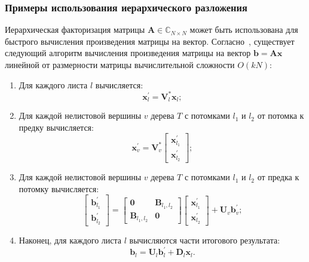 \subsubsection{Примеры использования иерархического разложения}
Иерархическая факторизация матрицы $\mathbf{A} \in \mathbb{C}_{N \times N}$ может быть использована для быстрого вычисления произведения матрицы на вектор. Согласно~\cite{probHSS}, существует следующий алгоритм вычисления произведения матрицы на вектор $\mathbf{b} = \mathbf{A}\mathbf{x}$ линейной от размерности матрицы вычислительной сложности $O(kN)$:
\begin{enumerate}
	\item Для каждого листа $l$ вычисляется:
	\[
		\mathbf{x}^{\prime}_{l} = \mathbf{V}^{*}_{l} \mathbf{x}_{l};
	\]
	\item Для каждой нелистовой вершины $v$ дерева $T$ с потомками $l_1$ и $l_2$ от потомка к предку вычисляется:
	\[
		\mathbf{x}^{\prime}_{v} = \mathbf{V}^{*}_{v}
		\begin{bmatrix}
			\mathbf{x}^{\prime}_{l_1} \\
			\mathbf{x}^{\prime}_{l_2}
		\end{bmatrix};
	\]
	\item Для каждой нелистовой вершины $v$ дерева $T$ с потомками $l_1$ и $l_2$ от предка к потомку вычисляется:
	\[
		\begin{bmatrix}
			\mathbf{b}^{\prime}_{l_1} \\
			\mathbf{b}^{\prime}_{l_2}
		\end{bmatrix}
		=
		\begin{bmatrix}
			\mathbf{0} & \mathbf{B}_{l_1,l_2} \\
			\mathbf{B}_{l_1,l_2} & \mathbf{0}
		\end{bmatrix}
		\begin{bmatrix}
			\mathbf{x}^{\prime}_{l_1} \\
			\mathbf{x}^{\prime}_{l_2}
		\end{bmatrix}
		+ \mathbf{U}_{v}\mathbf{b}^{\prime}_{v};
	\]
	\item Наконец, для каждого листа $l$ вычисляются части итогового результата:
	\[
		\mathbf{b}_{l} = \mathbf{U}_{l}\mathbf{b}^{\prime}_{l} + \mathbf{D}_{l}\mathbf{x}_{l}.
	\]
\end{enumerate}

